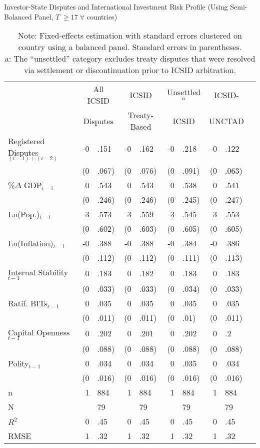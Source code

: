 \documentclass[12pt,onesided]{amsart}
\begin{document}
\begin{table}[ht]
\centering
\caption{Investor-State Disputes and International Investment Risk Profile (Using Semi-Balanced Panel, $T \; \geq 17 \;  \forall$ countries)}
\label{tab:dispRepLevelBal}
\begin{tabular}{lr@{} lr@{}lr@{}lr@{}lr@{}}
  \hline\hline
  & \multicolumn{2}{c}{All ICSID} & \multicolumn{2}{c}{ICSID} & \multicolumn{2}{c}{Unsettled$^{a}$} & \multicolumn{2}{c}{ICSID-} \\ 
  & \multicolumn{2}{c}{Disputes} & \multicolumn{2}{c}{Treaty-Based} & \multicolumn{2}{c}{ICSID} & \multicolumn{2}{c}{UNCTAD} \\
 \hline
Registered Disputes$_{(t-1) + (t-2)}$ & -0&.151 & -0&.162 & -0&.218 & -0&.122 \\ 
   & (0&.067) & (0&.076) & (0&.091) & (0&.063) \\ 
  \%$\Delta$ GDP$_{t-1}$ & 0&.543 & 0&.543 & 0&.538 & 0&.541 \\ 
   & (0&.246) & (0&.246) & (0&.245) & (0&.247) \\ 
  Ln(Pop.)$_{t-1}$ & 3&.573 & 3&.559 & 3&.545 & 3&.553 \\ 
   & (0&.602) & (0&.603) & (0&.605) & (0&.605) \\ 
  Ln(Inflation)$_{t-1}$ & -0&.388 & -0&.388 & -0&.384 & -0&.386 \\ 
   & (0&.112) & (0&.112) & (0&.111) & (0&.113) \\ 
  Internal Stability$_{t-1}$ & 0&.183 & 0&.182 & 0&.183 & 0&.183 \\ 
   & (0&.033) & (0&.033) & (0&.034) & (0&.033) \\ 
  Ratif. BITs$_{t-1}$ & 0&.035 & 0&.035 & 0&.035 & 0&.035 \\ 
   & (0&.011) & (0&.011) & (0&.01) & (0&.011) \\ 
  Capital Openness$_{t-1}$ & 0&.202 & 0&.201 & 0&.202 & 0&.2 \\ 
   & (0&.088) & (0&.088) & (0&.088) & (0&.088) \\ 
  Polity$_{t-1}$ & 0&.034 & 0&.034 & 0&.035 & 0&.034 \\ 
   & (0&.016) & (0&.016) & (0&.016) & (0&.016) \\ 
   \hline
n & 1&884 & 1&884 & 1&884 & 1&884 \\ 
  N && 79 && 79 && 79 && 79 \\ 
  $R^{2}$ & 0&.45 & 0&.45 & 0&.45 & 0&.45 \\ 
  RMSE & 1&.32 & 1&.32 & 1&.32 & 1&.32 \\ 
   \hline
\hline
\end{tabular}
\caption*{Note: Fixed-effects estimation with standard errors clustered on country using a balanced panel. Standard errors in parentheses. \\ a: The ``unsettled'' category excludes treaty disputes that were resolved via settlement or discontinuation prior to ICSID arbitration.}
\end{table}

\newpage

\end{document}
